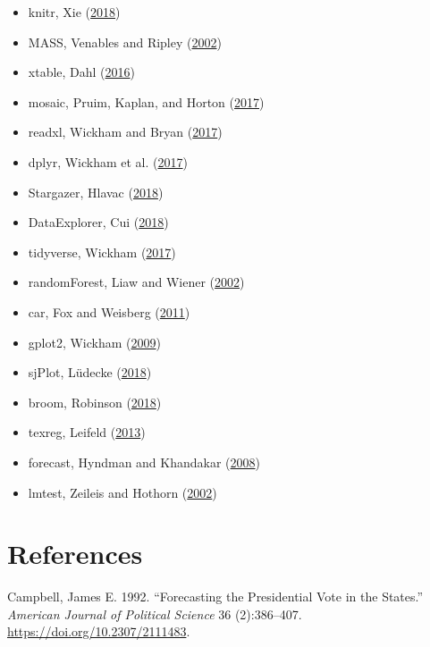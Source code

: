 \documentclass[11,]{article}
\providecommand{\tightlist}{%
  \setlength{\itemsep}{0pt}\setlength{\parskip}{0pt}}
\begin{document}
\begin{itemize}
\tightlist
\item
  knitr, Xie (\protect\hyperlink{ref-R-knitr}{2018})
\item
  MASS, Venables and Ripley (\protect\hyperlink{ref-MASS}{2002})
\item
  xtable, Dahl (\protect\hyperlink{ref-xtable}{2016})
\item
  mosaic, Pruim, Kaplan, and Horton
  (\protect\hyperlink{ref-mosaic}{2017})
\item
  readxl, Wickham and Bryan (\protect\hyperlink{ref-readxl}{2017})
\item
  dplyr, Wickham et al. (\protect\hyperlink{ref-dplyr}{2017})
\item
  Stargazer, Hlavac (\protect\hyperlink{ref-stargazer}{2018})
\item
  DataExplorer, Cui (\protect\hyperlink{ref-DataExplorer}{2018})
\item
  tidyverse, Wickham (\protect\hyperlink{ref-tidyverse}{2017})
\item
  randomForest, Liaw and Wiener
  (\protect\hyperlink{ref-randomForest}{2002})
\item
  car, Fox and Weisberg (\protect\hyperlink{ref-car}{2011})
\item
  gplot2, Wickham (\protect\hyperlink{ref-ggplot2}{2009})
\item
  sjPlot, Lüdecke (\protect\hyperlink{ref-sjPlot}{2018})
\item
  broom, Robinson (\protect\hyperlink{ref-broom}{2018})
\item
  texreg, Leifeld (\protect\hyperlink{ref-texreg}{2013})
\item
  forecast, Hyndman and Khandakar
  (\protect\hyperlink{ref-forecast}{2008})
\item
  lmtest, Zeileis and Hothorn (\protect\hyperlink{ref-lmtest}{2002})
\end{itemize}

\hypertarget{references}{%
\section*{References}\label{references}}

\hypertarget{refs}{}
\leavevmode\hypertarget{ref-campbell_forecasting_1992}{}%
Campbell, James E. 1992. ``Forecasting the Presidential Vote in the
States.'' \emph{American Journal of Political Science} 36 (2):386--407.
\url{https://doi.org/10.2307/2111483}.
\end{document}
